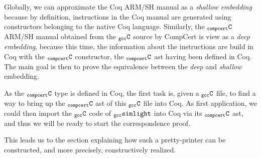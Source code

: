 \documentclass[a4paper, 11pt]{article}
\newcommand{\gccSL}{$_{\tt gcc}{\tt simlight}$\xspace}
\newcommand{\C}{$_{\tt compcert}{\tt C}$\xspace}
\newcommand{\gccC}{$_{\tt gcc}{\tt C}$\xspace}
\newcommand{\simsoc}{SimSoC\xspace}
\begin{document}
\hspace{1ex}

Globally, we can approximate the Coq ARM/SH manual as a \emph{shallow embedding} because by definition, instructions in the Coq manual are generated using constructors belonging to the native Coq language. Similarly, the \C ARM/SH manual obtained from the \gccC source by CompCert is view as a \emph{deep embedding}, because this time, the information about the instructions are build in Coq with the \C constructor, the \C ast having been defined in Coq. The main goal is then to prove the equivalence between the \emph{deep} and \emph{shallow} embedding.

As the \C type is defined in Coq, the first task is, given a \gccC file, to find a way to bring up the \C ast of this \gccC file into Coq. As first application, we could then import the \gccC code of \gccSL into Coq via its \C ast, and thus we will be ready to start the correspondence proof.

\hspace{1ex}

This leads us to the section explaining how such a pretty-printer can be constructed, and more precisely, constructively realized.
\end{document}
